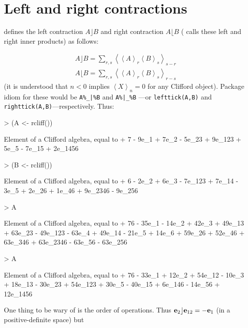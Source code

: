 \documentclass{birkjour}
\theoremstyle{definition}
\theoremstyle{remark}
\numberwithin{equation}{section}
\begin{document}
\section{Left and right contractions}

\cite{dorst2002} defines the left contraction $A\rfloor B$ and right
contraction $A\lfloor B$ (\cite{chisholm2012} calls these left and
right inner products) as follows:

\begin{eqnarray}
\displaystyle A\rfloor B = \sum_{r,s}\left\langle\left\langle
A\right\rangle_r\left\langle B\right\rangle_s\right\rangle_{s-r}\\
\displaystyle A\lfloor B = \sum_{r,s}\left\langle\left\langle
A\right\rangle_r\left\langle B\right\rangle_s\right\rangle_{r-s}
\end{eqnarray}
%
(it is understood that $n<0$ implies $\left\langle
  X\right\rangle_n=0$ for any Clifford object).
Package idiom for these would be {\tt A\%\_|\%B} and {\tt A\%|\_\%B}
---or {\tt lefttick(A,B)} and {\tt righttick(A,B)}---respectively.
Thus:

\begin{Schunk}
\begin{Sinput}
> (A <- rcliff())
\end{Sinput}
\begin{Soutput}
Element of a Clifford algebra, equal to
+ 7 - 9e_1 + 7e_2 - 5e_23 + 9e_123 + 5e_5 - 7e_15 + 2e_1456
\end{Soutput}
\begin{Sinput}
> (B <- rcliff())
\end{Sinput}
\begin{Soutput}
Element of a Clifford algebra, equal to
+ 6 - 2e_2 + 6e_3 - 7e_123 + 7e_14 - 3e_5 + 2e_26 + 1e_46 +
9e_2346 - 9e_256
\end{Soutput}
\begin{Sinput}
> A %
\end{Sinput}
\begin{Soutput}
Element of a Clifford algebra, equal to
+ 76 - 35e_1 - 14e_2 + 42e_3 + 49e_13 + 63e_23 - 49e_123 - 63e_4 +
49e_14 - 21e_5 + 14e_6 + 59e_26 + 52e_46 + 63e_346 + 63e_2346 -
63e_56 - 63e_256
\end{Soutput}
\begin{Sinput}
> A %
\end{Sinput}
\begin{Soutput}
Element of a Clifford algebra, equal to
+ 76 - 33e_1 + 12e_2 + 54e_12 - 10e_3 + 18e_13 - 30e_23 + 54e_123 +
30e_5 - 40e_15 + 6e_146 - 14e_56 + 12e_1456
\end{Soutput}
\end{Schunk}
%
One thing to be wary of is the order of operations.  Thus
${\bf e}_{2}\rfloor{\bf e}_{12}=-{\bf e}_{1}$ (in a positive-definite space) but
\end{document}
